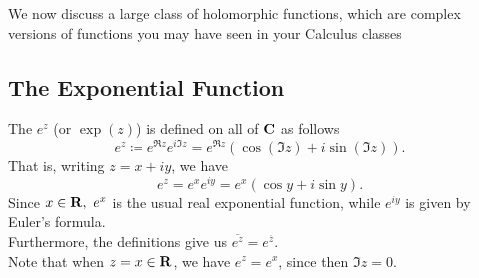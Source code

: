 \bigskip

We now discuss a large class of holomorphic functions, which are complex  versions of functions you may have seen in your Calculus classes

\medskip

\subsection{The Exponential Function}
%
\begin{definition}
The  $e^z$ (or $\exp(z)$) is defined on all of $\mathbf C$ as follows
\[e^z \coloneqq e^{\Re z}e^{i\Im z} = e^{\Re z}(\cos(\Im z) + i\sin(\Im z)).\]
That is, writing $z = x + iy$, we have
\[e^z = e^xe^{iy} = e^x(\cos y + i\sin y).\]
Since $x \in \mathbf R,\  e^x$ is the usual real exponential function, while $e^{iy}$ is given by Euler's formula.\\[0.5em]
Furthermore, the definitions give us $\overline{e^z} = e^{\overline{z}}$.\\[0.5em]
Note that when $z = x \in \mathbf R$, we have $e^z = e^x$, since then $\Im z = 0$.
\end{definition}

\medskip

